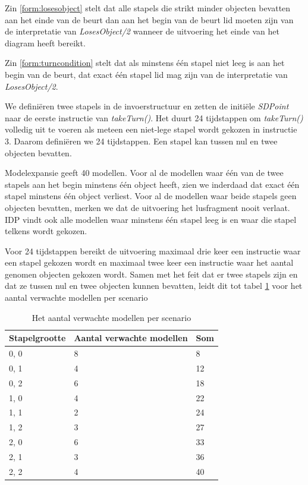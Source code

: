 Zin \ref{form:losesobject} stelt dat alle stapels die strikt minder objecten bevatten aan het einde van de beurt dan aan het begin van de beurt lid moeten zijn van de interpretatie van \textit{LosesObject/2} wanneer de uitvoering het einde van het diagram heeft bereikt.

Zin \ref{form:turncondition} stelt dat als minstens \'e\'en stapel niet leeg is aan het begin van de beurt, dat exact \'e\'en stapel lid mag zijn van de interpretatie van \textit{LosesObject/2}.

We defini\"eren twee stapels in de invoerstructuur en zetten de initi\"ele \textit{SDPoint} naar de eerste instructie van \textit{takeTurn()}. Het duurt 24 tijdstappen om \textit{takeTurn()} volledig uit te voeren als meteen een niet-lege stapel wordt gekozen in instructie 3. Daarom defini\"eren we 24 tijdstappen. Een stapel kan tussen nul en twee objecten bevatten.

Modelexpansie geeft 40 modellen. Voor al de modellen waar \'e\'en van de twee stapels aan het begin minstens \'e\'en object heeft, zien we inderdaad dat exact \'e\'en stapel minstens \'e\'en object verliest. Voor al de modellen waar beide stapels geen objecten bevatten, merken we dat de uitvoering het lusfragment nooit verlaat. IDP vindt ook alle modellen waar minstens \'e\'en stapel leeg is en waar die stapel telkens wordt gekozen. 

Voor 24 tijdstappen bereikt de uitvoering maximaal drie keer een instructie waar een stapel gekozen wordt en maximaal twee keer een instructie waar het aantal genomen objecten gekozen wordt. Samen met het feit dat er twee stapels zijn en dat ze tussen nul en twee objecten kunnen bevatten, leidt dit tot tabel \ref{tbl:exp-models} voor het aantal verwachte modellen per scenario

\begin{table}[]
	\centering
	\begin{tabular}{|l|l|l|}
\hline
Stapelgrootte & Aantal verwachte modellen & Som \\ \hline
0, 0          & 8                         & 8   \\ \hline
0, 1          & 4                         & 12  \\ \hline
0, 2          & 6                         & 18  \\ \hline
1, 0          & 4                         & 22  \\ \hline
1, 1          & 2                         & 24  \\ \hline
1, 2          & 3                         & 27  \\ \hline
2, 0          & 6                         & 33  \\ \hline
2, 1          & 3                         & 36  \\ \hline
2, 2          & 4                         & 40  \\ \hline
\end{tabular}
	\caption{Het aantal verwachte modellen per scenario}
	\label{tbl:exp-models}
\end{table}

